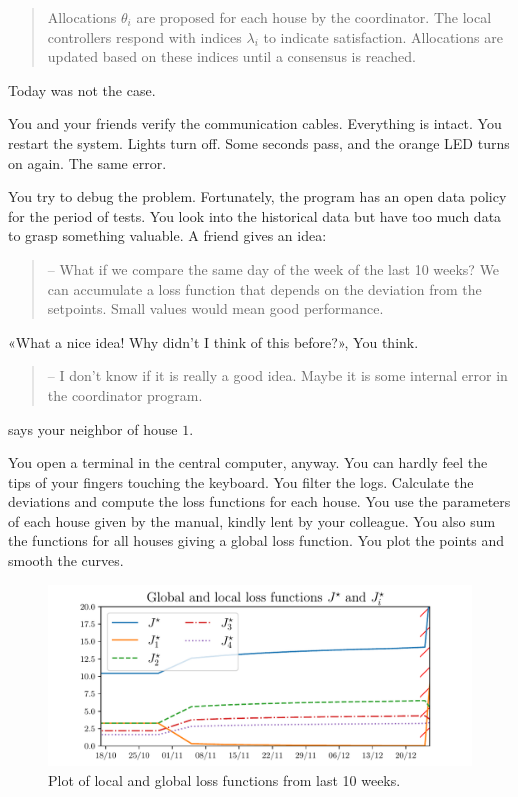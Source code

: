 \documentclass[../main.tex]{subfiles}
\begin{document}
\begin{quote}
  \raggedright
  Allocations $\theta_{i}$ are proposed for each house by the coordinator.
  The local controllers respond with indices $\lambda_{i}$ to indicate satisfaction. Allocations are updated based on these indices until a consensus is reached.
\end{quote}
Today was not the case.

You and your friends verify the communication cables.
Everything is intact. You restart the system.
Lights turn off. Some seconds pass, and the orange LED turns on again.
The same error.

You try to debug the problem.
Fortunately, the program has an open data policy for the period of tests.
You look into the historical data but have too much data to grasp something valuable.
A friend gives an idea:
\begin{quote}
  -- What if we compare the same day of the week of the last 10 weeks? We can accumulate a loss function that depends on the deviation from the setpoints.
  Small values would mean good performance.
\end{quote}

«What a nice idea! Why didn't I think of this before?», You think.
\begin{quote}
-- I don't know if it is really a good idea. Maybe it is some internal error in the coordinator program.
\end{quote}
says your neighbor of house $1$.

You open a terminal in the central computer, anyway.
You can hardly feel the tips of your fingers touching the keyboard.
You filter the logs. Calculate the deviations and compute the loss functions for each house. You use the parameters of each house given by the manual, kindly lent by your colleague.
You also sum the functions for all houses giving a global loss function.
You plot the points and smooth the curves.
\begin{figure}[H]
  \centering
  \includegraphics[width=.8\textwidth]{../img/example_introduction/example_J.pdf}
  \caption{Plot of local and global loss functions from last 10 weeks.}\label{fig:change_in_j}
\end{figure}
\end{document}
